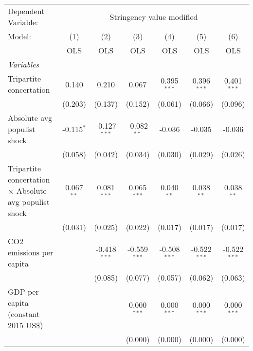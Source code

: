 
\begingroup
\centering
\begin{tabular}{lcccccc}
   \toprule
   Dependent Variable: & \multicolumn{6}{c}{Stringency value modified}\\
   Model:                                                        & (1)          & (2)            & (3)            & (4)            & (5)            & (6)\\  
                                                                 &  OLS         & OLS            & OLS            & OLS            & OLS            & OLS\\  
   \midrule
   \emph{Variables}\\
   Tripartite concertation                                       & 0.140        & 0.210          & 0.067          & 0.395$^{***}$  & 0.396$^{***}$  & 0.401$^{***}$\\   
                                                                 & (0.203)      & (0.137)        & (0.152)        & (0.061)        & (0.066)        & (0.096)\\   
   Absolute avg populist shock                                   & -0.115$^{*}$ & -0.127$^{***}$ & -0.082$^{**}$  & -0.036         & -0.035         & -0.036\\   
                                                                 & (0.058)      & (0.042)        & (0.034)        & (0.030)        & (0.029)        & (0.026)\\   
   Tripartite concertation $\times$ Absolute avg populist shock  & 0.067$^{**}$ & 0.081$^{***}$  & 0.065$^{***}$  & 0.040$^{**}$   & 0.038$^{**}$   & 0.038$^{**}$\\   
                                                                 & (0.031)      & (0.025)        & (0.022)        & (0.017)        & (0.017)        & (0.017)\\   
   CO2 emissions per capita                                      &              & -0.418$^{***}$ & -0.559$^{***}$ & -0.508$^{***}$ & -0.522$^{***}$ & -0.522$^{***}$\\   
                                                                 &              & (0.085)        & (0.077)        & (0.057)        & (0.062)        & (0.063)\\   
   GDP per capita (constant 2015 US\$)                           &              &                & 0.000$^{***}$  & 0.000$^{***}$  & 0.000$^{***}$  & 0.000$^{***}$\\   
                                                                 &              &                & (0.000)        & (0.000)        & (0.000)        & (0.000)\\   

\end{tabular}

